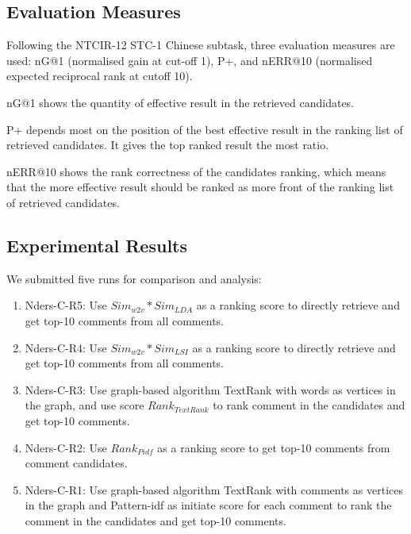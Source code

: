 \documentclass{sig-alternate}
\begin{document}
\subsection{Evaluation Measures}
Following the NTCIR-12 STC-1 Chinese subtask, three evaluation measures are
used: nG@1 (normalised gain at cut-off 1), P+, and nERR@10 (normalised expected reciprocal rank at cutoff 10)\cite{Lifeng}.

nG@1 shows the quantity of effective result in the retrieved candidates. 

P+ depends most on the position of the best effective result in the
ranking list of retrieved candidates. It gives the top ranked result
the most ratio. 

nERR@10 shows the rank correctness of the candidates ranking,
which means that the more effective result should be ranked as
more front of the ranking list of retrieved candidates.

\subsection{Experimental Results}
We submitted five runs for comparison and analysis:

\begin{enumerate}
  \item{Nders-C-R5: } Use $Sim_{w2v}*Sim_{LDA}$ as a ranking score to directly 
  retrieve and get top-10 comments from all comments.
  \item{Nders-C-R4: } Use $Sim_{w2v}*Sim_{LSI}$ as a ranking score to directly 
  retrieve and get top-10 comments from all comments.
  \item{Nders-C-R3: } Use graph-based algorithm TextRank with words as vertices
  in the graph, and use score $Rank_{TextRank}$ to rank comment in the 
  candidates and get top-10 comments.
  \item{Nders-C-R2: } Use $Rank_{Pidf}$ as a ranking score to get top-10 comments from comment candidates.
  \item{Nders-C-R1: } Use graph-based algorithm TextRank with comments as vertices in the graph and Pattern-idf as initiate score for each comment to 
  rank the comment in the candidates and get top-10 comments.
\end{enumerate}
\end{document}
